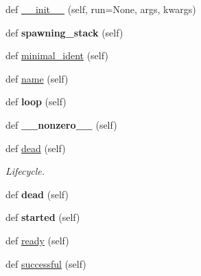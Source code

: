 \begin{DoxyCompactItemize}
\item 
def \hyperlink{classgevent_1_1greenlet_1_1_greenlet_a5cd9e6984f6334243ac371786654c1e6}{\+\_\+\+\_\+init\+\_\+\+\_\+} (self, run=None, args, kwargs)
\item 
\mbox{\label{classgevent_1_1greenlet_1_1_greenlet_a74c37bada42bfb9f038c62be1d4e1b3d}} 
def {\bfseries spawning\+\_\+stack} (self)
\item 
def \hyperlink{classgevent_1_1greenlet_1_1_greenlet_aa10558687f387958347de1c50c2df5aa}{minimal\+\_\+ident} (self)
\item 
def \hyperlink{classgevent_1_1greenlet_1_1_greenlet_ad99614432874dcd22030718c39f83974}{name} (self)
\item 
\mbox{\label{classgevent_1_1greenlet_1_1_greenlet_aa94c1638623569d559f1c54f5ad4b4a9}} 
def {\bfseries loop} (self)
\item 
\mbox{\label{classgevent_1_1greenlet_1_1_greenlet_a5546ee09cb5d9eeab60606cd99d69fe7}} 
def {\bfseries \+\_\+\+\_\+nonzero\+\_\+\+\_\+} (self)
\item 
\mbox{\label{classgevent_1_1greenlet_1_1_greenlet_a14930f1a66f1d92f74780d5219e5b5ce}} 
def \hyperlink{classgevent_1_1greenlet_1_1_greenlet_a14930f1a66f1d92f74780d5219e5b5ce}{dead} (self)
\begin{DoxyCompactList}\small\item\em Lifecycle. \end{DoxyCompactList}\item 
\mbox{\label{classgevent_1_1greenlet_1_1_greenlet_a14930f1a66f1d92f74780d5219e5b5ce}} 
def {\bfseries dead} (self)
\item 
\mbox{\label{classgevent_1_1greenlet_1_1_greenlet_ad44701703a7205f4c7973076d60df87f}} 
def {\bfseries started} (self)
\item 
def \hyperlink{classgevent_1_1greenlet_1_1_greenlet_ad9b9e5e6f3a649358b5f5679f1edff50}{ready} (self)
\item 
def \hyperlink{classgevent_1_1greenlet_1_1_greenlet_a8ff843d99c90b7347262884dbc89cbe8}{successful} (self)

\end{DoxyCompactItemize}
